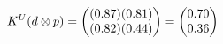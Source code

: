 \documentclass[preview]{standalone}
\begin{document}
\begin{align*}
\special{dvisvgm:raw <g id='unique000'>}K^U(d \otimes p) = \begin{pmatrix} (0.87)(0.81) \\ (0.82)(0.44) \end{pmatrix} = \begin{pmatrix} 0.70 \\ 0.36 \end{pmatrix}\special{dvisvgm:raw </g>}
\end{align*}
\end{document}
